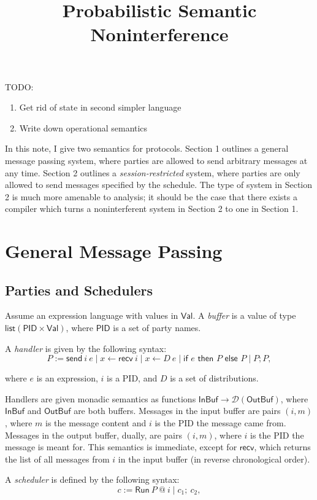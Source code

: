 \documentclass{article}
\title {Probabilistic Semantic Noninterference}
\newcommand{\Val}{\mathsf{Val}}
\newcommand{\InBuf}{\mathsf{InBuf}}
\newcommand{\OutBuf}{\mathsf{OutBuf}}
\newcommand{\PID}{\mathsf{PID}}
\newcommand{\List}{\mathsf{list}}
\newcommand{\D}{\mathcal{D}}
\newcommand{\send}{\mathsf{send}}
\newcommand{\recv}{\mathsf{recv}}
\begin{document}
\maketitle

TODO: 
\begin{enumerate}
    \item Get rid of state in second simpler language
    \item Write down operational semantics
\end{enumerate}

In this note, I give two semantics for protocols. Section 1 outlines a general message passing system, where parties are allowed to send arbitrary messages at any time. Section 2 outlines a \emph{session-restricted} system, where parties are only allowed to send messages specified by the schedule. 
The type of system in Section 2 is much more amenable to analysis; it should be the case that there exists a compiler which turns a noninterferent system in Section 2 to one in Section 1.

\section{General Message Passing}
\subsection{Parties and Schedulers}

Assume an expression language with values in $\Val$. A \emph{buffer} is a value of type $\List (\PID \times \Val)$, where $\PID$ is a set of party names.

A \emph{handler} is given by the following syntax:
\[ P := \send\ i\ e \mid x \leftarrow \recv\ i \mid x \leftarrow D\ e \mid \textsf{if } e \textsf{ then } P \textsf{ else } P \mid P; P, \]

where $e$ is an expression, $i$ is a PID, and $D$ is a set of distributions.

Handlers are given monadic semantics as functions $\InBuf \to \D(\OutBuf)$, where $\InBuf$ and $\OutBuf$ are both buffers. Messages in the input buffer are pairs $(i,m)$, where $m$ is the message content and $i$ is the PID the message came from. Messages in the output buffer, dually, are pairs $(i,m)$, where $i$ is the PID the message is meant for. This semantics is immediate, except for $\recv$, which returns the list of all messages from $i$ in the input buffer (in reverse chronological order).

A \emph{scheduler} is defined by the following syntax:
\[ c := \textsf{Run}\ P\ @\ i \mid c_1;\ c_2, \]
\end{document}
